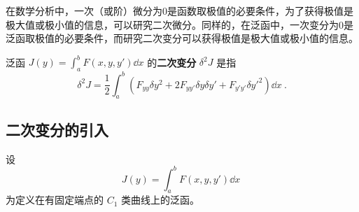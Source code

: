 

在数学分析中，一次（或阶）微分为0是函数取极值的必要条件，为了获得极值是极大值或极小值的信息，可以研究二次微分。同样的，在泛函中，一次变分为0是泛函取极值的必要条件，而研究二次变分可以获得极值是极大值或极小值的信息。

泛函 $J(y)=\int_a^bF(x,y,y')\dd x$ 的\textbf{二次变分} $\delta^2J$ 是指
\begin{equation}
\delta^2J=\frac{1}{2}\int_a^b(F_{yy}\delta y^2+2F_{yy'}\delta y\delta y'+F_{y'y'}\delta y'^2)\dd x~.
\end{equation}
\subsection{二次变分的引入}
设 
\begin{equation}
J(y)=\int_a^bF(x,y,y')\dd x~
\end{equation}
为定义在有固定端点的 $C_1$ 类曲线上的泛函。

